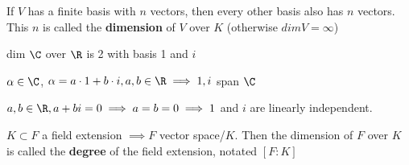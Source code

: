 \documentclass[twoside, 10pt]{article}
\begin{document}
\begin{cor}
    If $V$ has a finite basis with $n$ vectors, then every other basis also has $n$ vectors. This $n$ is called the \textbf{dimension} of $V$ over $K$ (otherwise $dim V = \infty$)
\end{cor}

\begin{exm*}
    dim $\C$ over $\R$ is 2 with basis 1 and $i$
\end{exm*}
$\alpha \in \C$, $\alpha = a \cdot 1 + b \cdot i, a, b \in \R \implies 1, i$ span $\C$

$a, b\in \R, a + bi = 0\implies a = b = 0 \implies 1$ and $i$ are linearly independent. 

\begin{defn}
    $K \subset F$ a field extension $\implies F$ vector space/$K$. Then the dimension of $F$ over $K$ is called the \textbf{degree} of the field extension, notated $\left[F : K\right]$
\end{defn}
\end{document}
